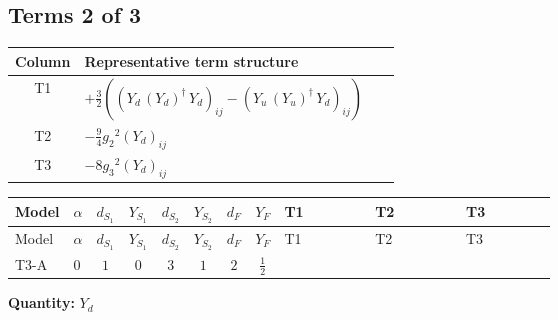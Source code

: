 \documentclass[8pt]{article}
\begin{document}
\begin{landscape}
\subsection*{Terms 2 of 3}
\begin{center}
\begin{tabular}{@{}c >{\raggedright\arraybackslash}p{0.82\linewidth}@{}}
\toprule
Column & Representative term structure \\
\midrule
T1 & \(\displaystyle +\frac{3}{2} (\left({Y_d}\,\left({Y_d}\right)^{\dagger}\,{Y_d}\right)_{ij}-\left({Y_u}\,\left({Y_u}\right)^{\dagger}\,{Y_d}\right)_{ij})\) \\
\midrule
T2 & \(\displaystyle -\frac{9}{4} {g_2}^2 \left({Y_d}\right)_{ij}\) \\
\midrule
T3 & \(\displaystyle -8 {g_3}^2 \left({Y_d}\right)_{ij}\) \\
\midrule
\bottomrule
\end{tabular}
\end{center}
\smallskip
\tiny
\begin{longtable}{@{}llcccccc >{\raggedright\arraybackslash}p{0.21\linewidth} >{\raggedright\arraybackslash}p{0.21\linewidth} >{\raggedright\arraybackslash}p{0.21\linewidth}@{}}
\toprule
Model & $\alpha$ & $d_{S_1}$ & $Y_{S_1}$ & $d_{S_2}$ & $Y_{S_2}$ & $d_F$ & $Y_F$ & T1 & T2 & T3 \\
\midrule
\endfirsthead
\toprule
Model & $\alpha$ & $d_{S_1}$ & $Y_{S_1}$ & $d_{S_2}$ & $Y_{S_2}$ & $d_F$ & $Y_F$ & T1 & T2 & T3 \\
\midrule
\endhead
T3-A & $0$ & $1$ & $0$ & $3$ & $1$ & $2$ & $\frac{1}{2}$ & \scriptsize\adjustbox{max width=\linewidth}{$\begin{gathered} +\frac{3}{2} (\left({Y_d}\,\left({Y_d}\right)^{\dagger}\,{Y_d}\right)_{ij}-\left({Y_u}\,\left({Y_u}\right)^{\dagger}\,{Y_d}\right)_{ij})\end{gathered}$} & \scriptsize\adjustbox{max width=\linewidth}{$\begin{gathered} -\frac{9}{4} {g_2}^2 \left({Y_d}\right)_{ij}\end{gathered}$} & \scriptsize\adjustbox{max width=\linewidth}{$\begin{gathered} -8 {g_3}^2 \left({Y_d}\right)_{ij}\end{gathered}$} \\
\midrule
\bottomrule
\end{longtable}
\clearpage
\noindent\textbf{Quantity: }$Y_d$\par\smallskip

\end{landscape}
\end{document}
